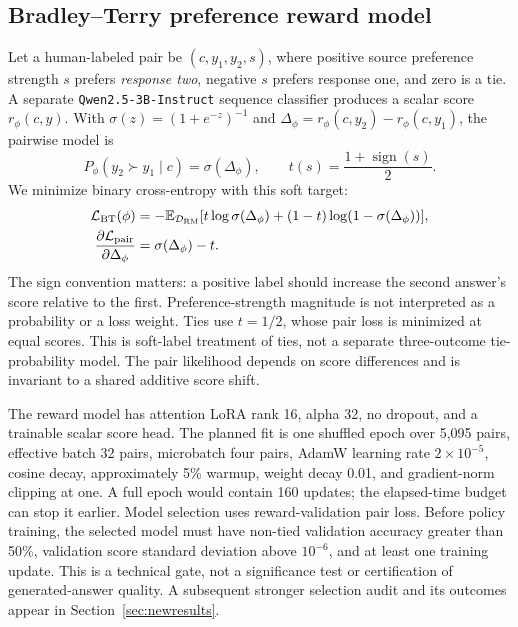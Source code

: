 \subsection{Bradley--Terry preference reward model}
Let a human-labeled pair be $(c,y_1,y_2,s)$, where positive source preference
strength $s$ prefers \emph{response two}, negative $s$ prefers response one,
and zero is a tie. A separate
\texttt{Qwen2.5-3B-Instruct} sequence classifier produces a scalar score
$r_\phi(c,y)$. With $\sigma(z)=(1+e^{-z})^{-1}$ and
$\Delta_\phi=r_\phi(c,y_2)-r_\phi(c,y_1)$, the pairwise model is
\begin{equation}
 P_\phi(y_2\succ y_1\mid c)=\sigma(\Delta_\phi),
 \qquad t(s)=\frac{1+\operatorname{sign}(s)}{2}.
 \label{eq:btprob}
\end{equation}
We minimize binary cross-entropy with this soft target:
\begin{align}
 \mathcal L_{\mathrm{BT}}(\phi)
 &=-\mathbb{E}_{\mathcal D_{\mathrm{RM}}}
  [t\log\sigma(\Delta_\phi)+(1-t)\log(1-\sigma(\Delta_\phi))],
 \label{eq:btloss}\\
 \frac{\partial\mathcal L_{\mathrm{pair}}}{\partial\Delta_\phi}
 &=\sigma(\Delta_\phi)-t.
 \label{eq:btgradient}
\end{align}
The sign convention matters: a positive label should increase the second
answer's score relative to the first. Preference-strength magnitude is
not interpreted as a probability or a loss weight. Ties use $t=1/2$,
whose pair loss is minimized at equal scores. This is soft-label treatment
of ties, not a separate three-outcome tie-probability model. The pair
likelihood depends on score differences and is invariant to a shared
additive score shift.

The reward model has attention LoRA rank 16, alpha 32, no dropout, and a
trainable scalar score head. The planned fit is one shuffled epoch over
5,095 pairs, effective batch 32 pairs, microbatch four pairs, AdamW learning
rate $2\times10^{-5}$, cosine decay, approximately 5\% warmup, weight
decay 0.01, and gradient-norm clipping at one. A full epoch would contain
160 updates; the elapsed-time budget can stop it earlier. Model selection
uses reward-validation pair loss. Before policy training, the selected
model must have non-tied validation accuracy greater than 50\%, validation
score standard deviation above $10^{-6}$, and at least one training
update. This is a technical gate, not a significance test or certification
of generated-answer quality. A subsequent stronger selection audit and
its outcomes appear in Section~\ref{sec:newresults}.

